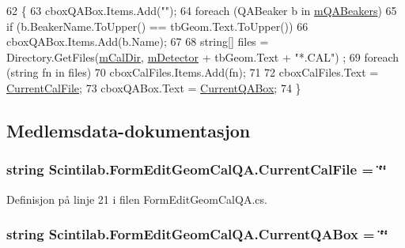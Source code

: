 \begin{DoxyCode}
62         \{
63             cboxQABox.Items.Add(\textcolor{stringliteral}{""});
64             \textcolor{keywordflow}{foreach} (QABeaker b \textcolor{keywordflow}{in} \hyperlink{class_scintilab_1_1_form_edit_geom_cal_q_a_a8465be0742cd30958c2575a537f28ba2}{mQABeakers})
65                 \textcolor{keywordflow}{if} (b.BeakerName.ToUpper() == tbGeom.Text.ToUpper())
66                     cboxQABox.Items.Add(b.Name);
67 
68             \textcolor{keywordtype}{string}[] files = Directory.GetFiles(\hyperlink{class_scintilab_1_1_form_edit_geom_cal_q_a_a3f8a6138f8dc3a87ff3301739f7aad0a}{mCalDir}, \hyperlink{class_scintilab_1_1_form_edit_geom_cal_q_a_afadb7ab76847266dd9281e95ac5d3ce4}{mDetector} + tbGeom.Text + \textcolor{stringliteral}{"*.CAL"})
      ;
69             \textcolor{keywordflow}{foreach} (\textcolor{keywordtype}{string} fn \textcolor{keywordflow}{in} files)
70                 cboxCalFiles.Items.Add(fn);
71 
72             cboxCalFiles.Text = \hyperlink{class_scintilab_1_1_form_edit_geom_cal_q_a_a629f62216840fddcd8d5bc5a9ff7dfa1}{CurrentCalFile};
73             cboxQABox.Text = \hyperlink{class_scintilab_1_1_form_edit_geom_cal_q_a_ad8fe4f87eb8b5fc08f6877b766d4a161}{CurrentQABox};
74         \}
\end{DoxyCode}


\subsection{Medlemsdata-\/dokumentasjon}
\hypertarget{class_scintilab_1_1_form_edit_geom_cal_q_a_a629f62216840fddcd8d5bc5a9ff7dfa1}{
\subsubsection[{Current\+Cal\+File}]{\setlength{\rightskip}{0pt plus 5cm}string Scintilab.\+Form\+Edit\+Geom\+Cal\+Q\+A.\+Current\+Cal\+File = \char`\"{}\char`\"{}}}\label{class_scintilab_1_1_form_edit_geom_cal_q_a_a629f62216840fddcd8d5bc5a9ff7dfa1}


Definisjon på linje 21 i filen Form\+Edit\+Geom\+Cal\+Q\+A.\+cs.

\hypertarget{class_scintilab_1_1_form_edit_geom_cal_q_a_ad8fe4f87eb8b5fc08f6877b766d4a161}{
\subsubsection[{Current\+Q\+A\+Box}]{\setlength{\rightskip}{0pt plus 5cm}string Scintilab.\+Form\+Edit\+Geom\+Cal\+Q\+A.\+Current\+Q\+A\+Box = \char`\"{}\char`\"{}}}\label{class_scintilab_1_1_form_edit_geom_cal_q_a_ad8fe4f87eb8b5fc08f6877b766d4a161}


